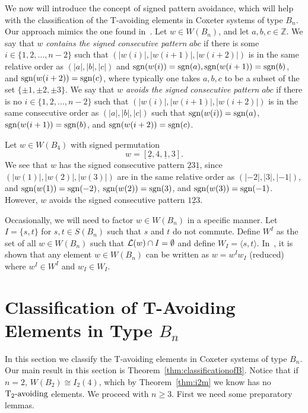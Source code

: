 We now will introduce the concept of signed pattern avoidance, which will help with the classification of the T-avoiding elements in Coxeter systems of type $B_n$. Our approach mimics the one found in~\cite{Gern2013a}. Let $w \in W(B_n)$, and let $a,b,c \in \mathbb{Z}$. We say that $w$ \emph{contains the signed consecutive pattern} $abc$ if there is some $i \in \{1,2, \ldots, n-2\}$ such that $(|w(i)|,|w(i+1)|,|w(i+2)|)$ is in the same relative order as $(|a|,|b|,|c|)$ and $\mathrm{sgn}(w(i))=\mathrm{sgn}(a), \mathrm{sgn}(w(i+1))=\mathrm{sgn}(b)$, and $\mathrm{sgn}(w(i+2))=\mathrm{sgn}(c)$, where typically one takes $a,b,c$ to be a subset of the set $\{\pm1,\pm2,\pm3\}$. We say that $w$ \emph{avoids the signed consecutive pattern} $abc$ if there is no $i \in \{1,2, \ldots, n-2\}$ such that $\left(|w(i)|, |w(i+1)|, |w(i+2)|\right)$ is in the same consecutive order as $\left(|a|, |b|, |c| \right)$ such that $\mathrm{sgn}(w(i))=\mathrm{sgn}(a)$, $\mathrm{sgn}(w(i+1))=\mathrm{sgn}(b)$, and $\mathrm{sgn}(w(i+2))=\mathrm{sgn}(c)$.

\begin{example}
Let $w \in W(B_4)$ with signed permutation \[w=[\underline{2},4, \underline{1}, 3].\] We see that $w$ has the signed consecutive pattern $\underline{2} 3 \underline{1}$, since $(|w(1)|, |w(2)|, |w(3)|)$ are in the same relative order as $(|-2|, |3|, |-1|)$, and $\mathrm{sgn}(w(1))=\mathrm{sgn}(-2)$, $\mathrm{sgn}(w(2))=\mathrm{sgn}(3)$, and $\mathrm{sgn}(w(3))=\mathrm{sgn}(-1)$. However, $w$ avoids the signed consecutive pattern $1\underline{2}3$.
\end{example}

Occasionally, we will need to factor $w \in W(B_n)$ in a specific manner. Let $I=\{s,t\}$ for $s, t \in S(B_n)$ such that $s$ and $t$ do not commute. Define $W^I$ as the set of all $w \in W(B_n)$ such that $\mathcal{L}(w) \cap I= \emptyset$ and define $W_I=\langle s,t \rangle$. In~\cite{Humphreys1990}, it is shown that any element $w \in W(B_n)$ can be written as $w=w^Iw_I$ (reduced) where $w^I \in W^I$ and $w_I \in W_I$.

\section{Classification of T-Avoiding Elements in Type $B_n$}\label{sec:TAB}


In this section we classify the T-avoiding elements in Coxeter systems of type $B_n$. Our main result in this section is Theorem~\ref{thm:classificationofB}. Notice that if $n=2$, $W(B_2) \cong I_2(4)$, which by Theorem~\ref{thm:i2m} we know has no $\operatorname{T_2-\mathrm{avoiding}}$ elements. We proceed with $n \geq 3$. First we need some preparatory lemmas. 


